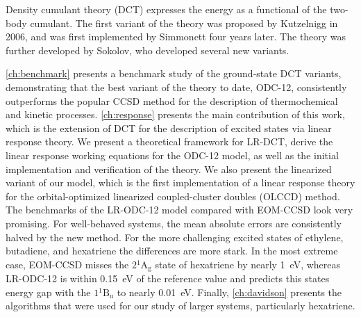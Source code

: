 Density cumulant theory (DCT) expresses the energy as a functional of the
two-body cumulant.
The first variant of the theory was proposed by Kutzelnigg in
2006,\cite{Kutzelnigg:2006p171101} and was first implemented by Simmonett four
years later.\cite{Simmonett:2010p174122}
The theory was further developed by Sokolov, who developed several new
variants.\cite{Sokolov:2013p024107,Sokolov:2013p204110,Sokolov:2014p074111}

\cref{ch:benchmark} presents a benchmark study of the ground-state DCT variants,
demonstrating that the best variant of the theory to date, ODC-12, consistently
outperforms the popular CCSD method for the description of thermochemical and
kinetic processes.
\cref{ch:response} presents the main contribution of this work, which is the
extension of DCT for the description of excited states via linear response
theory.
We present a theoretical framework for LR-DCT, derive the linear response
working equations for the ODC-12 model, as well as the initial implementation
and verification of the theory.
We also present the linearized variant of our model, which is the first
implementation of a linear response theory for the orbital-optimized linearized
coupled-cluster doubles (OLCCD) method.
The benchmarks of the LR-ODC-12 model compared with EOM-CCSD look very
promising.
For well-behaved systems, the mean absolute errors are consistently halved by
the new method.
For the more challenging excited states of ethylene, butadiene, and hexatriene
the differences are more stark.
In the most extreme case, EOM-CCSD misses the \(2{}^1\mathrm{A_g}\) state of
hexatriene by nearly 1~eV, whereas LR-ODC-12 is within 0.15~eV of the reference
value and predicts this states energy gap with the \(1{}^1\mathrm{B_u}\) to
nearly 0.01~eV.
Finally, \cref{ch:davidson} presents the algorithms that were used for our study
of larger systems, particularly hexatriene.
